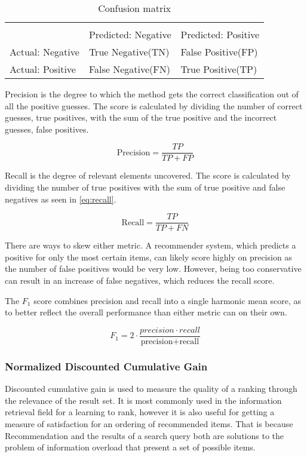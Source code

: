 \begin{table}[H]\label{tab:testandevaluation_confusionmatrix}
	\centering
	\begin{tabular}{ l|ll }
		\multicolumn{3}{l}{} \\
		& Predicted: Negative & Predicted: Positive \\ \hline
		Actual: Negative & True Negative(TN) & False Positive(FP) \\
		Actual: Positive & False Negative(FN) & True Positive(TP) \\ \hline
	\end{tabular}
	\caption{Confusion matrix}
\end{table}

Precision is the degree to which the method gets the correct classification out of all the positive guesses. The score is calculated by dividing the number of correct guesses, true positives, with the sum of the true positive and the incorrect guesses, false positives.

\begin{equation}\label{eq:precision}
	\text{Precision} = \frac{TP}{TP+FP}
\end{equation}

Recall is the degree of relevant elements uncovered. The score is calculated by dividing the number of true positives with the sum of true positive and false negatives as seen in \ref{eq:recall}.

\begin{equation}\label{eq:recall}
\text{Recall} = \frac{TP}{TP+FN}
\end{equation}

There are ways to skew either metric. A recommender system, which predicts a positive for only the most certain items, can likely score highly on precision as the number of false positives would be very low. However, being too conservative can result in an increase of false negatives, which reduces the recall score.

The $F_1$ score combines precision and recall into a single harmonic mean score, as to better reflect the overall performance than either metric can on their own.

\begin{equation}
	F_1 = 2 \cdot \frac{precision \cdot recall}{\text{precision} + \text{recall}}
\end{equation}

\subsubsection{Normalized Discounted Cumulative Gain}
Discounted cumulative gain is used to measure the quality of a ranking through the relevance of the result set. It is most commonly used in the information retrieval field for a learning to rank, however it is also useful for getting a measure of satisfaction for an ordering of recommended items. That is because Recommendation and the results of a search query both are solutions to the problem of information overload that present a set of possible items.\cite{recsyshandbook} \cite{baltrunas}

